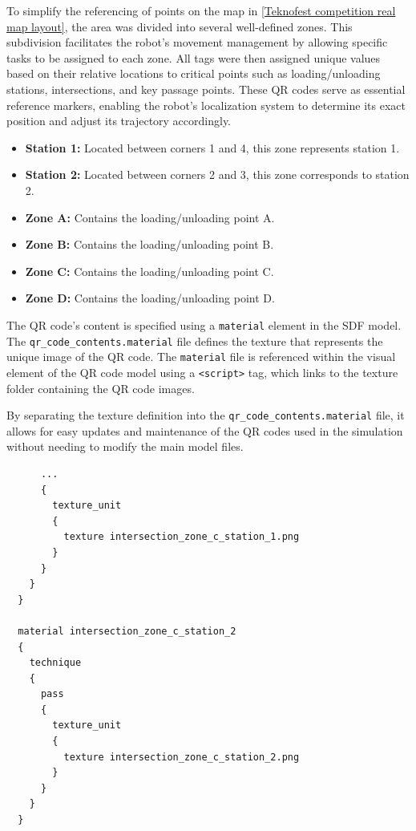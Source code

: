 \documentclass[../../main]{subfiles}
\begin{document}
\begin{itemize}
To simplify the referencing of points on the map in \cref{Teknofest competition real map layout}, the area was divided into several
well-defined zones. This subdivision facilitates the robot's movement management by
allowing specific tasks to be assigned to each zone. All tags were then 
assigned unique values based on their relative locations to critical
points such as loading/unloading stations, intersections, and key passage points.
These QR codes serve as essential reference markers, enabling the robot’s localization
system to determine its exact position and adjust its trajectory accordingly.

\begin{itemize}
\item \textbf{Station 1:} Located between corners 1 and 4, this zone represents station 1.
\item \textbf{Station 2:} Located between corners 2 and 3, this zone corresponds to station 2.
\item \textbf{Zone A:} Contains the loading/unloading point A.
\item \textbf{Zone B:} Contains the loading/unloading point B.
\item \textbf{Zone C:} Contains the loading/unloading point C.
\item \textbf{Zone D:} Contains the loading/unloading point D.
\end{itemize}

The QR code's content is specified using a \texttt{material} element in the SDF model. 
The \texttt{qr\_code\_contents.material} file defines the texture that represents the unique 
image of the QR code. The \texttt{material} file is referenced within the visual element of the 
QR code model using a \texttt{<script>} tag, which links to the texture folder containing 
the QR code images.

By separating the texture definition into the \texttt{qr\_code\_contents.material} 
file, it allows for easy updates and maintenance of the QR codes used in the simulation 
without needing to modify the main model files. 

    \begin{verbatim}
      ...
      {
        texture_unit
        {
          texture intersection_zone_c_station_1.png
        }
      }
    }
  }
  
  material intersection_zone_c_station_2
  {
    technique
    {
      pass
      {
        texture_unit
        {
          texture intersection_zone_c_station_2.png
        }
      }
    }
  }
  

\end{verbatim}
\end{itemize}
\end{document}
